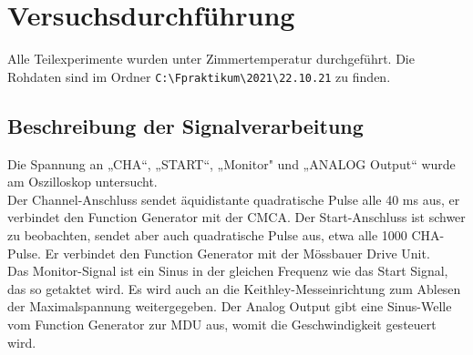 \documentclass[german,  %
parskip=full,  %
headsepline]{scrartcl}
\begin{document}
\section{Versuchsdurchführung}
Alle Teilexperimente wurden unter Zimmertemperatur durchgeführt. Die Rohdaten sind im Ordner \verb+C:\Fpraktikum\2021\22.10.21+ zu finden.
\subsection{Beschreibung der Signalverarbeitung}
Die Spannung an „CHA“, „START“, „Monitor" und „ANALOG Output“ wurde am Oszilloskop untersucht.\\
Der Channel-Anschluss sendet äquidistante quadratische Pulse alle 40 ms aus, er verbindet den Function Generator mit der CMCA. Der Start-Anschluss ist schwer zu beobachten, sendet aber auch quadratische Pulse aus, etwa alle 1000 CHA-Pulse. Er verbindet den Function Generator mit der Mössbauer Drive Unit. \\Das Monitor-Signal ist ein Sinus in der gleichen Frequenz wie das Start Signal, das so getaktet wird. Es wird auch an die Keithley-Messeinrichtung zum Ablesen der Maximalspannung weitergegeben. Der Analog Output gibt eine Sinus-Welle vom Function Generator zur MDU aus, womit die Geschwindigkeit gesteuert wird.
\end{document}

